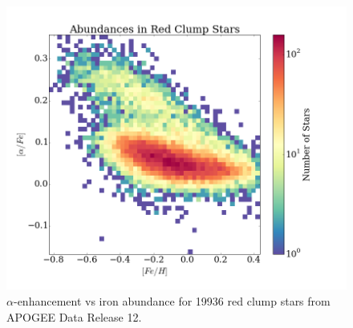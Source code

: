 \documentclass[preprint]{aastex}
\begin{document}
\begin{figure}%
\begin{centering}
\includegraphics[width = 0.8\linewidth]{alpha_vs_fe.png}
\caption{$\alpha$-enhancement vs iron abundance for 19936 red clump stars from APOGEE Data Release 12.}
\end{centering}
\label{fig:abun}
\end{figure}




\end{document}
